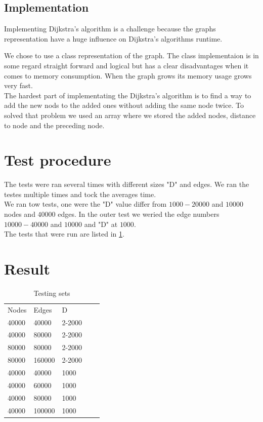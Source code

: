 \documentclass[paper=a4, fontsize=11pt]{scrartcl}
\numberwithin{equation}{section}		%
\numberwithin{figure}{section}			%
\numberwithin{table}{section}				%
\begin{document}
\subsection{Implementation}
Implementing Dijkstra’s algorithm is a challenge because the graphs representation have a huge influence on Dijkstra’s algorithms runtime.

 We chose to use a class representation of the graph. The class implementaion is in some regard straight forward and logical but has a clear disadvantages when it comes to memory consumption. When the graph grows its memory usage grows very fast.
\\

The hardest part of implementating the Dijkstra’s algorithm is to find a way to add the new nods to the added ones without adding the same node twice. To solved that problem we used an array where we stored the added nodes, distance to node and the preceding node.


\section{Test procedure}
The tests were ran several times with different sizes "D" and edges. We ran the testes multiple times and tock the averages time.
\\

We ran tow tests, one were the "D" value differ from $1 000-20 000$ and $10 000$ nodes and $40 000$ edges. In the outer test we weried the edge numbers $10 000-40 000$ and $10 000$ and  "D" at $1000$. 
\\

The tests that were run are listed in \ref{Testing sets}.
\section{Result}
\begin{table}[]
\centering
\caption{Testing sets}
\label{Testing sets}
\begin{tabular}{lllll}
Nodes & Edges & D \\
40000 & 40000 & 2-2000 \\
40000 & 80000 & 2-2000 \\
80000 & 80000 & 2-2000 \\
80000 & 160000 & 2-2000 \\
40000 & 40000 & 1000 \\
40000 & 60000 & 1000 \\
40000 & 80000 & 1000 \\
40000 & 100000 & 1000 \\
\end{tabular}
\end{table}
\end{document}
